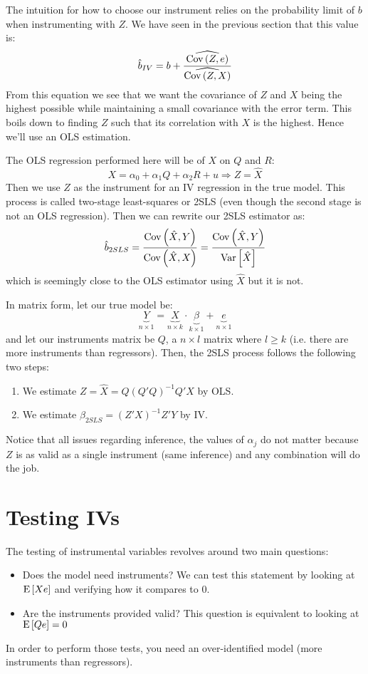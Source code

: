 The intuition for how to choose our instrument relies on the probability limit of $b$ when instrumenting with $Z$. We have seen in the previous section that this value is: $$\hat b_{IV} = b + \frac{\widehat{\operatorname{Cov}\left(Z, e\right)}}{\widehat{\operatorname{Cov}\left(Z,X\right)}} $$ From this equation we see that we want the covariance of $Z$ and $X$ being the highest possible while maintaining a small covariance with the error term. This boils down to finding $Z$ such that its correlation with $X$ is the highest. Hence we'll use an OLS estimation.

The OLS regression performed here will be of $X$ on $Q$ and $R$: $$X = \alpha_0 + \alpha_1 Q + \alpha_2 R + u \Rightarrow Z = \hat X$$ Then we use $Z$ as the instrument for an IV regression in the true model. This process is called two-stage least-squares or 2SLS (even though the second stage is not an OLS regression). Then we can rewrite our 2SLS estimator as: $$\hat b_{2SLS} = \frac{\operatorname{Cov}\left(\hat X, Y\right)}{\operatorname{Cov}\left(\hat X, X\right)} = \frac{\operatorname{Cov}\left(\hat X, Y\right)}{\operatorname{Var}\left[\hat X\right]} $$ which is seemingly close to the OLS estimator using $\hat X$ but it is not.

In matrix form, let our true model be: $$ \underbrace{Y}_{n\times 1} = \underbrace{X}_{n\times k}\cdot \underbrace{\beta}_{k\times 1} + \underbrace{e}_{n\times 1} $$ and let our instruments matrix be $Q$, a $n\times l$ matrix where $l\geq k$ (i.e. there are more instruments than regressors). Then, the 2SLS process follows the following two steps:\begin{enumerate}
\item We estimate $Z = \hat X = Q(Q'Q)^{-1}Q'X$ by OLS.
\item We estimate $\beta_{2SLS} = (Z'X)^{-1}Z'Y$ by IV.
\end{enumerate}
Notice that all issues regarding inference, the values of $\alpha_j$ do not matter because $Z$ is as valid as a single instrument (same inference) and any combination will do the job.

\section{Testing IVs}

The testing of instrumental variables revolves around two main questions:\begin{itemize}
\item Does the model need instruments? We can test this statement by looking at $\operatorname{E}\left[Xe\right]$ and verifying how it compares to 0.
\item Are the instruments provided valid? This question is equivalent to looking at $\operatorname{E}\left[Qe\right] =0$
\end{itemize}
In order to perform those tests, you need an over-identified model (more instruments than regressors).

